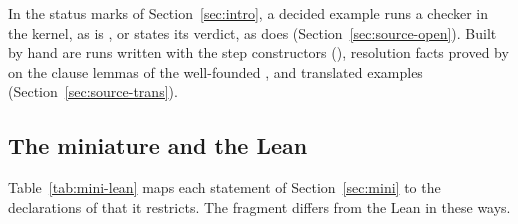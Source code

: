 In the status marks of Section~\ref{sec:intro}, a decided example runs a checker in the kernel, as  is , or states its verdict, as  does (Section~\ref{sec:source-open}). Built by hand are runs written with the step constructors (), resolution facts proved by  on the clause lemmas of the well-founded , and translated examples (Section~\ref{sec:source-trans}).

\subsection{The miniature and the Lean}\label{sec:mech-mini}

Table~\ref{tab:mini-lean} maps each statement of Section~\ref{sec:mini} to the declarations of \treeK that it restricts. The fragment differs from the Lean in these ways.
